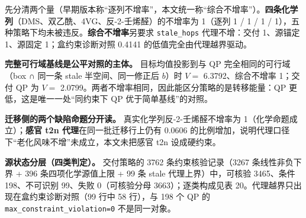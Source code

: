 \documentclass[11pt,a4paper]{article}
\begin{document}
先分清两个量（早期版本称``逐列不增率''，本文统一称``综合不增率''）。\textbf{四条化学列}（DMS、双乙酰、4VG、反-2-壬烯醛）的不增率为
1（逐列 1 / 1 / 1 / 1），五种策略下均未被违反。\textbf{综合不增率}另要求
\texttt{stale\_hops} 代理不增：交付 1、源锚定 1、源固定
1；盒约束诊断对照 0.4141 的低值完全由代理越界驱动。

\textbf{完整可行域基线是公平对照的主体。} 目标均值投影到与 QP
完全相同的可行域（box ∩ 同一条 stale 半空间、同一修正后 \(b\)）时 \(V=\)
6.3792、综合不增率 1；交付 QP 为 \(V=\)
2.0799。两者不增率相同，因此能区分策略的是转移能量：QP
更低，这是唯一一处``同约束下 QP 优于简单基线''的对照。

\textbf{迁移侧的两个缺陷命题分开读。} 真实化学列反-2-壬烯醛不增率为
1（化学命题成立）；\textbf{感官 t2n 代理}在同一批迁移行上仍有 0.0606
的比例增加，说明代理口径下``老化风味不增''未成立，本文未把感官 t2n
设成硬约束。

\textbf{源状态分层（四类判定）。} 交付策略的 3762 条约束核验记录（3267
条线性非负下界 + 396 条四项化学源值上限 + 99 条 stale
代理上界）中，可核验 3465、条件 198、不可识别 99、失败 0（可核验分母
3663）；逐类构成见表 20。代理越界只出现在盒约束诊断对照（99 行中 58
行），与 198 个 QP 的 \texttt{max\_constraint\_violation=0}
不是同一对象。
\end{document}
